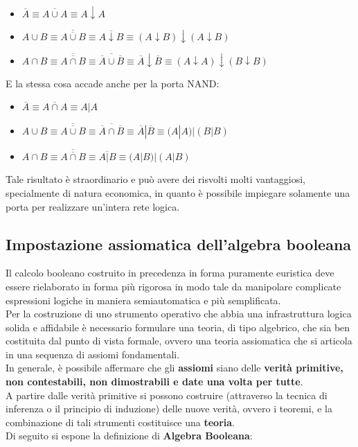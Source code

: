 \documentclass[a4paper]{extarticle}
\begin{document}
\begin{itemize}
    \item \(\overline{A} \equiv \overline{A \cup A} \equiv A \downarrow A\)
    \item \(A \cup B \equiv \overline{\overline{A \cup B}} \equiv \overline{A \downarrow B} \equiv (A \downarrow B) \downarrow (A \downarrow B)\)
    \item \(A \cap B \equiv \overline{\overline{A \cap B}} \equiv \overline{\overline{A} \cup \overline{B}} \equiv \overline{A} \downarrow \overline{B} \equiv (A \downarrow A) \downarrow (B \downarrow B)\)
\end{itemize}
E la stessa cosa accade anche per la porta NAND:
\begin{itemize}
    \item \(\overline{A} \equiv \overline{A \cap A} \equiv A | A\)
    \item \(A \cup B \equiv \overline{\overline{A \cup B}} \equiv \overline{\overline{A} \cap \overline{B}} \equiv \overline{A} | \overline{B} \equiv (A | A) | (B | B)\)
    \item \(A \cap B \equiv \overline{\overline{A \cap B}} \equiv \overline{A \vert B} \equiv (A | B) | (A | B)\)
\end{itemize}

\noindent
Tale risultato è straordinario e può avere dei risvolti molti vantaggiosi, specialmente di natura economica, in quanto è possibile impiegare solamente una porta per realizzare un'intera rete logica.

\subsection{Impostazione assiomatica dell'algebra booleana}
Il calcolo booleano costruito in precedenza in forma puramente euristica deve essere rielaborato in forma più rigorosa in modo tale da manipolare complicate espressioni logiche in maniera semiautomatica e più semplificata.\\
Per la costruzione di uno strumento operativo che abbia una infrastruttura logica solida e affidabile è necessario formulare una teoria, di tipo algebrico, che sia ben costituita dal punto di vista formale, ovvero una teoria assiomatica che si articola in una sequenza di assiomi fondamentali.\\
In generale, è possibile affermare che gli \textbf{assiomi} siano delle \textbf{verità primitive, non contestabili, non dimostrabili e date una volta per tutte}.\\
A partire dalle verità primitive si possono costruire (attraverso la tecnica di inferenza o il principio di induzione) delle nuove verità, ovvero i teoremi, e la combinazione di tali strumenti costituisce una \textbf{teoria}.\\
Di seguito si espone la definizione di \textbf{Algebra Booleana}:
\end{document}
